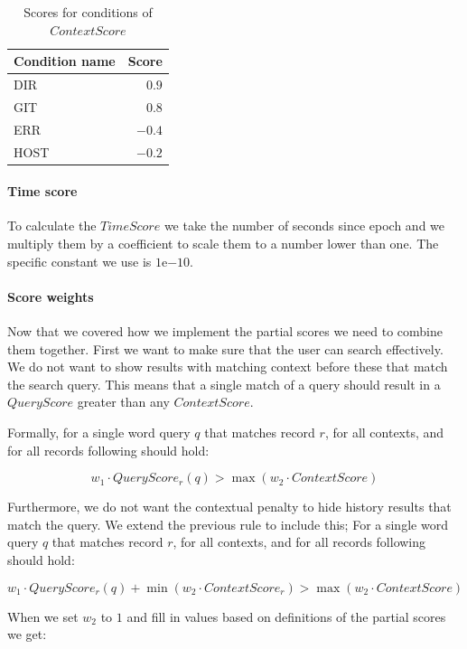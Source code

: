 \documentclass[thesis=M,english]{FITthesis}[2012/10/20]
\begin{document}
\begin{table}[h!]
\centering
\begin{tabular}{lr}
\hline \hline
Condition name & Score \\
\hline
DIR         & \(0.9\)   \\ 
GIT         & \(0.8\)   \\ 
ERR         & \(-0.4\)     \\
HOST        & \(-0.2\)     \\ 
\hline \hline
\end{tabular}
\caption{Scores for conditions of \(ContextScore\)}
\label{tab:score-context-impl-values}
\end{table}

\paragraph{Time score}


To calculate the \(TimeScore\) we take the number of seconds since epoch and we multiply them by a coefficient to scale them to a number lower than one. The specific constant we use is $1\mathrm{e}{-10}$.

\paragraph{Score weights}

Now that we covered how we implement the partial scores we need to combine them together.
First we want to make sure that the user can search effectively. We do not want to show results with matching context before these that match the search query. This means that a single match of a query should result in a \(QueryScore\) greater than any \(ContextScore\).

Formally, for a single word query \(q\) that matches record \(r\), for all contexts, and for all records following should hold: 

\[  w_1 \cdot QueryScore_r(q) > \max{(w_2 \cdot ContextScore)} \]

Furthermore, we do not want the contextual penalty to hide history results that match the query. We extend the previous rule to include this; For a single word query \(q\) that matches record \(r\), for all contexts, and for all records following should hold:

\[  w_1 \cdot QueryScore_r(q) + \min{(w_2 \cdot ContextScore_r)} > \max{(w_2 \cdot ContextScore)} \]

When we set \(w_2\) to \(1\) and fill in values based on definitions of the partial scores we get:
\end{document}
